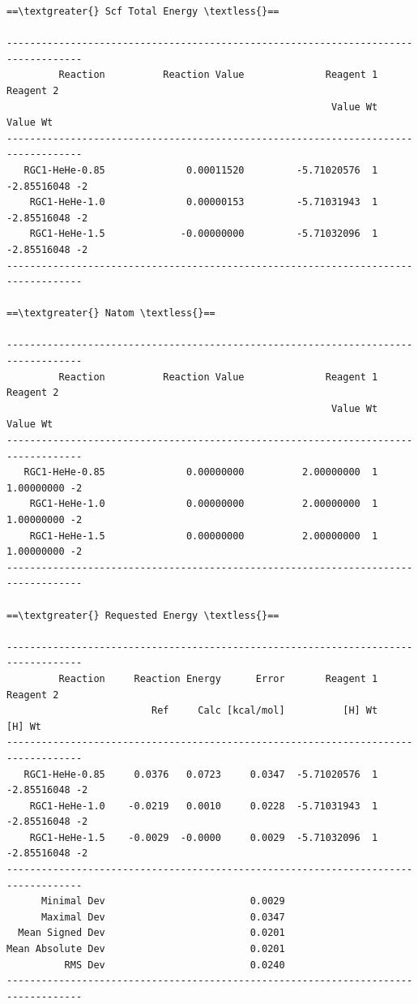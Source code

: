 \documentclass[letterpaper,10pt,english]{sphinxmanual}
\begin{document}
\begin{Verbatim}[commandchars=\\\{\}]
==\textgreater{} Scf Total Energy \textless{}==

-----------------------------------------------------------------------------------
         Reaction          Reaction Value              Reagent 1       Reagent 2
                                                        Value Wt        Value Wt
-----------------------------------------------------------------------------------
   RGC1-HeHe-0.85              0.00011520         -5.71020576  1  -2.85516048 -2
    RGC1-HeHe-1.0              0.00000153         -5.71031943  1  -2.85516048 -2
    RGC1-HeHe-1.5             -0.00000000         -5.71032096  1  -2.85516048 -2
-----------------------------------------------------------------------------------

==\textgreater{} Natom \textless{}==

-----------------------------------------------------------------------------------
         Reaction          Reaction Value              Reagent 1       Reagent 2
                                                        Value Wt        Value Wt
-----------------------------------------------------------------------------------
   RGC1-HeHe-0.85              0.00000000          2.00000000  1   1.00000000 -2
    RGC1-HeHe-1.0              0.00000000          2.00000000  1   1.00000000 -2
    RGC1-HeHe-1.5              0.00000000          2.00000000  1   1.00000000 -2
-----------------------------------------------------------------------------------

==\textgreater{} Requested Energy \textless{}==

-----------------------------------------------------------------------------------
         Reaction     Reaction Energy      Error       Reagent 1       Reagent 2
                         Ref     Calc [kcal/mol]          [H] Wt          [H] Wt
-----------------------------------------------------------------------------------
   RGC1-HeHe-0.85     0.0376   0.0723     0.0347  -5.71020576  1  -2.85516048 -2
    RGC1-HeHe-1.0    -0.0219   0.0010     0.0228  -5.71031943  1  -2.85516048 -2
    RGC1-HeHe-1.5    -0.0029  -0.0000     0.0029  -5.71032096  1  -2.85516048 -2
-----------------------------------------------------------------------------------
      Minimal Dev                         0.0029
      Maximal Dev                         0.0347
  Mean Signed Dev                         0.0201
Mean Absolute Dev                         0.0201
          RMS Dev                         0.0240
-----------------------------------------------------------------------------------
\end{Verbatim}
\end{document}
